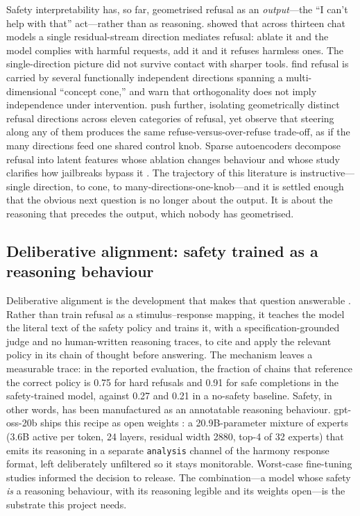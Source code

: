 \documentclass[10pt]{article}
\begin{document}
Safety interpretability has, so far, geometrised refusal as an \emph{output}---the
``I can't help with that'' act---rather than as reasoning. \citet{arditi2024refusal}
showed that across thirteen chat models a single residual-stream direction mediates
refusal: ablate it and the model complies with harmful requests, add it and it
refuses harmless ones. The single-direction picture did not survive contact with
sharper tools. \citet{wollschlager2025geometry} find refusal is carried by several
functionally independent directions spanning a multi-dimensional ``concept cone,''
and warn that orthogonality does not imply independence under intervention.
\citet{joad2026more} push further, isolating geometrically distinct refusal
directions across eleven categories of refusal, yet observe that steering along
any of them produces the same refuse-versus-over-refuse trade-off, as if the many
directions feed one shared control knob. Sparse autoencoders decompose refusal into
latent features whose ablation changes behaviour and whose study clarifies how
jailbreaks bypass it \citep{yeo2025refusalsae}. The trajectory of this literature
is instructive---single direction, to cone, to many-directions-one-knob---and it
is settled enough that the obvious next question is no longer about the output. It
is about the reasoning that precedes the output, which nobody has geometrised.

\subsection{Deliberative alignment: safety trained as a reasoning behaviour}

Deliberative alignment is the development that makes that question answerable
\citep{guan2024deliberative}. Rather than train refusal as a stimulus--response
mapping, it teaches the model the literal text of the safety policy and trains it,
with a specification-grounded judge and no human-written reasoning traces, to cite
and apply the relevant policy in its chain of thought before answering. The
mechanism leaves a measurable trace: in the reported evaluation, the fraction of
chains that reference the correct policy is 0.75 for hard refusals and 0.91 for
safe completions in the safety-trained model, against 0.27 and 0.21 in a no-safety
baseline. Safety, in other words, has been manufactured as an annotatable reasoning
behaviour. \mbox{gpt-oss-20b} ships this recipe as open weights
\citep{openai2025gptoss}: a 20.9B-parameter mixture of experts (3.6B active per
token, 24 layers, residual width 2880, top-4 of 32 experts) that emits its
reasoning in a separate \texttt{analysis} channel of the harmony response format,
left deliberately unfiltered so it stays monitorable. Worst-case fine-tuning
studies \citep{wallace2025worstcase} informed the decision to release. The
combination---a model whose safety \emph{is} a reasoning behaviour, with its
reasoning legible and its weights open---is the substrate this project needs.
\end{document}
